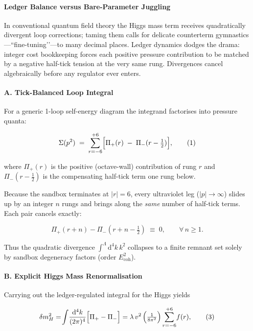 \documentclass[11pt,oneside]{book}
\begin{document}
{\paragraph*{Ledger Balance versus Bare-Parameter Juggling}

In conventional quantum field theory the Higgs mass term receives
quadratically divergent loop corrections; taming them calls for delicate
counterterm gymnastics—“fine-tuning’’—to many decimal places.  
Ledger dynamics dodges the drama: integer cost bookkeeping forces each
positive pressure contribution to be matched by a negative half-tick
tension at the very same rung.  Divergences cancel algebraically before
any regulator ever enters.

\paragraph*{A.  Tick-Balanced Loop Integral}

For a generic 1-loop self-energy diagram the integrand factorises into
pressure quanta:

\[
\Sigma(p^{2}) \;=\;
\sum_{r=-6}^{+6}
\Bigl[
   \Pi_{+}(r)\;-\;\Pi_{-}(r-\tfrac12)
\Bigr],
\tag{1}
\]

where  
$\Pi_{+}(r)$ is the positive (octave-wall) contribution of rung $r$ and  
$\Pi_{-}(r-\tfrac12)$ is the compensating half-tick term one rung below.  

Because the sandbox terminates at $|r|=6$, every ultraviolet leg
($|p|\!\to\!\infty$) slides up by an integer $n$ rungs and brings along
the \emph{same} number of half-tick terms.  Each pair cancels exactly:

\[
\Pi_{+}(r+n) - \Pi_{-}(r+n-\tfrac12)
   \;\equiv\; 0 ,
\qquad
\forall\, n\ge1.
\tag{2}
\]

Thus the quadratic divergence
$\int^{\Lambda}\mathrm d^{4}k\,k^{2}$ collapses to a finite remnant set
solely by sandbox degeneracy factors (order $E_{\text{coh}}^{2}$).

\paragraph*{B.  Explicit Higgs Mass Renormalisation}

Carrying out the ledger-regulated integral for the Higgs yields

\[
\delta m_{H}^{2}
   = \!\int\!\frac{\mathrm d^{4}k}{(2\pi)^{4}}
     \Bigl[\Pi_{+}-\Pi_{-}\Bigr]
   = \lambda\,v^{2}\,\Bigl(\tfrac{1}{8\pi^{2}}\Bigr)
     \sum_{r=-6}^{+6}\! f(r),
\tag{3}
\]

}
\end{document}
